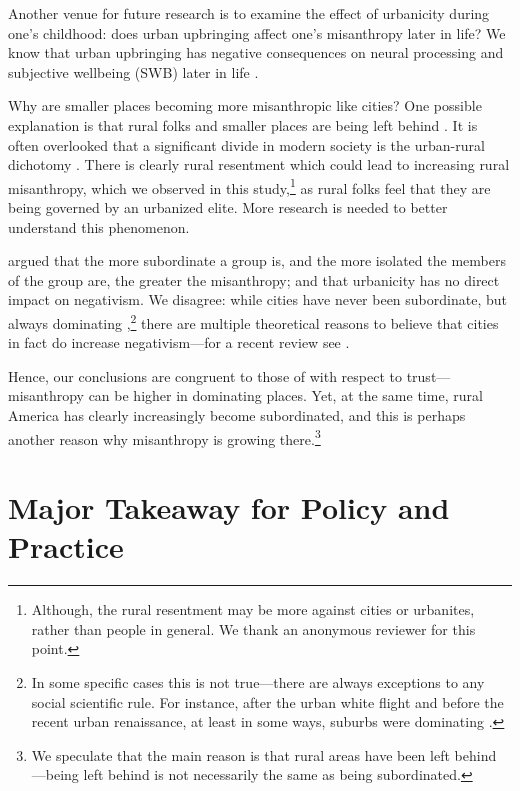 \documentclass[11pt, letterpaper]{article}
\begin{document}
\begin{spacing}{1.4}
Another venue for future research is to examine the effect of urbanicity during
one's childhood: does urban upbringing affect one's misanthropy later in life?
We know that urban upbringing has negative consequences on neural processing and
subjective wellbeing (SWB) later in life \citep{lederbogen11,aok20}. 

Why are smaller places becoming more misanthropic like cities? One possible
explanation is that rural folks and smaller places are being left behind
\citep{aokCityBook15}. It is often overlooked that a significant divide in
modern society is the urban-rural dichotomy
\citep{hansonCityJournalautumn15,hansonCJ17winter17}. There is clearly rural
resentment which could lead to increasing rural misanthropy, which we observed
in this study,\footnote{Although, the rural resentment may be more against
  cities or urbanites, rather than people in general. We thank an anonymous
  reviewer for this point.} as rural folks feel that they are being governed by an urbanized elite. More research is needed to better understand this phenomenon.

\citet{smith97} argued that the more subordinate a group is, and the more isolated the members of the group are, the greater the misanthropy; and that urbanicity has no direct impact on negativism.  %
We disagree: while cities have never been subordinate, but always dominating \citep[e.g.,][]{aok-sizeFetish17},\footnote{In some specific cases this is not
   true---there are always exceptions to any social scientific rule. For instance, after the urban white flight and before the recent urban renaissance, at least in some ways, suburbs were dominating \citep[e.g.,][]{adams14}.} there are multiple theoretical reasons to believe that cities in fact do increase negativism---for a recent review see \citet{aokCityBook15}. 
   
Hence, our conclusions are congruent to those of \citet{schilke15} with respect to trust---misanthropy can be higher in dominating places. Yet, at the same
 time, rural America has clearly increasingly become subordinated, and this is perhaps another reason why misanthropy is growing there.\footnote{We speculate that the main reason is that rural areas have been left behind \citep{hansonCityJournalautumn15,hansonCJ17winter17,fullerNYT17monD}---being left behind is not necessarily the same as being subordinated.}  

\section*{Major Takeaway for Policy and Practice}


\end{spacing}
\end{document}
